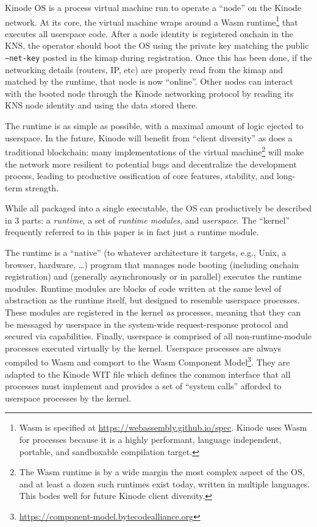 \documentclass[runningheads]{llncs}
\begin{document}
Kinode OS is a process virtual machine run to operate a ``node'' on the Kinode network.
At its core, the virtual machine wraps around a Wasm runtime\footnote{Wasm is specified at \url{https://webassembly.github.io/spec}. Kinode uses Wasm for processes because it is a highly performant, language independent, portable, and sandboxable compilation target.}
that executes all userspace code.
After a node identity is registered onchain in the KNS, the operator should boot the OS using the private key matching the public \verb|~net-key| posted in the kimap during registration.
Once this has been done, if the networking details (routers, IP, etc) are properly read from the kimap and matched by the runtime, that node is now ``online''.
Other nodes can interact with the booted node through the Kinode networking protocol by reading its KNS node identity and using the data stored there.

The runtime is as simple as possible, with a maximal amount of logic ejected to userspace.
In the future, Kinode will benefit from ``client diversity'' as does a traditional blockchain: many implementations of the virtual machine\footnote{The Wasm runtime is by a wide margin the most complex aspect of the OS, and at least a dozen such runtimes exist today, written in multiple languages.
This bodes well for future Kinode client diversity.}
will make the network more resilient to potential bugs and decentralize the development process, leading to productive ossification of core features, stability, and long-term strength.

While all packaged into a single executable, the OS can productively be described in 3 parts: a \textit{runtime}, a set of \textit{runtime modules}, and \textit{userspace}.
The ``kernel'' frequently referred to in this paper is in fact just a runtime module.

The runtime is a ``native'' (to whatever architecture it targets, e.g., Unix, a browser, hardware, \ldots) program that manages node booting (including onchain registration) and (generally asynchronously or in parallel) executes the runtime modules.
Runtime modules are blocks of code written at the same level of abstraction as the runtime itself, but designed to resemble userspace processes.
These modules are registered in the kernel \textit{as} processes, meaning that they can be messaged by userspace in the system-wide request-response protocol and secured via capabilities.
Finally, userspace is comprised of all non-runtime-module processes executed virtually by the kernel.
Userspace processes are always compiled to Wasm and comport to the Wasm Component Model\footnote{\url{https://component-model.bytecodealliance.org}}.
They are adapted to the Kinode WIT file which defines the common interface that all processes must implement and provides a set of ``system calls'' afforded to userspace processes by the kernel.
\end{document}
